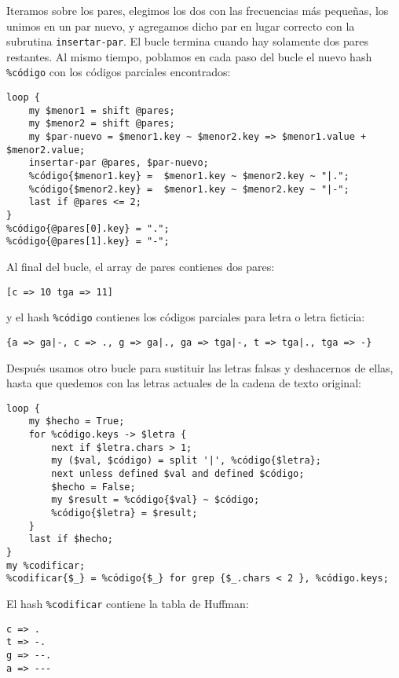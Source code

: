 Iteramos sobre los pares, elegimos los dos con las frecuencias
más pequeñas, los unimos en un par nuevo, y agregamos dicho par
en lugar correcto con la subrutina {\tt insertar-par}. El bucle
termina cuando hay solamente dos pares restantes. Al mismo tiempo,
poblamos en cada paso del bucle el nuevo hash \verb|%código| con
los códigos parciales encontrados:

\begin{verbatim}
loop {
    my $menor1 = shift @pares;
    my $menor2 = shift @pares;
    my $par-nuevo = $menor1.key ~ $menor2.key => $menor1.value + $menor2.value;
    insertar-par @pares, $par-nuevo;
    %código{$menor1.key} =  $menor1.key ~ $menor2.key ~ "|.";
    %código{$menor2.key} =  $menor1.key ~ $menor2.key ~ "|-";
    last if @pares <= 2;
}
%código{@pares[0].key} = ".";
%código{@pares[1].key} = "-";
\end{verbatim}

Al final del bucle, el array de pares contienes dos pares:

\begin{verbatim}
[c => 10 tga => 11]
\end{verbatim}

y el hash \verb|%código| contienes los códigos parciales 
para letra o letra ficticia:

\begin{verbatim}
{a => ga|-, c => ., g => ga|., ga => tga|-, t => tga|., tga => -}
\end{verbatim}

Después usamos otro bucle para sustituir las letras falsas y deshacernos
de ellas, hasta que quedemos con las letras actuales de la cadena de
texto original:

\begin{verbatim}
loop {   
    my $hecho = True;
    for %código.keys -> $letra {
        next if $letra.chars > 1;
        my ($val, $código) = split '|', %código{$letra};
        next unless defined $val and defined $código;
        $hecho = False;
        my $result = %código{$val} ~ $código;
        %código{$letra} = $result;
    }
    last if $hecho;
}
my %codificar;
%codificar{$_} = %código{$_} for grep {$_.chars < 2 }, %código.keys;
\end{verbatim}

El hash \verb|%codificar| contiene la tabla de Huffman:

\begin{verbatim}
c => .
t => -.
g => --.
a => ---
\end{verbatim}

